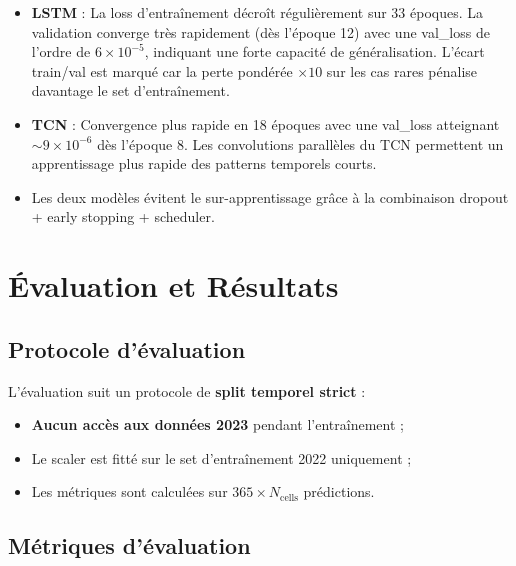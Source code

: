\documentclass[12pt,a4paper]{report}
\begin{document}
\begin{firebox}[title=Observations sur les courbes d'apprentissage]
\begin{itemize}[leftmargin=*,itemsep=3pt]
  \item \textbf{LSTM} : La loss d'entraînement décroît régulièrement sur 33 époques.
    La validation converge très rapidement (dès l'époque 12) avec une val\_loss
    de l'ordre de $6 \times 10^{-5}$, indiquant une forte capacité de généralisation.
    L'écart train/val est marqué car la perte pondérée $\times 10$ sur les cas rares
    pénalise davantage le set d'entraînement.
  \item \textbf{TCN} : Convergence plus rapide en 18 époques avec une val\_loss
    atteignant $\sim 9 \times 10^{-6}$ dès l'époque 8. Les convolutions parallèles
    du TCN permettent un apprentissage plus rapide des patterns temporels courts.
  \item Les deux modèles évitent le sur-apprentissage grâce à la combinaison
    dropout + early stopping + scheduler.
\end{itemize}
\end{firebox}

\clearpage

\chapter{Évaluation et Résultats}
\label{chap:eval}

\section{Protocole d'évaluation}

L'évaluation suit un protocole de \textbf{split temporel strict} :
\begin{itemize}[leftmargin=*]
  \item \textbf{Aucun accès aux données 2023} pendant l'entraînement ;
  \item Le scaler est fitté sur le set d'entraînement 2022 uniquement ;
  \item Les métriques sont calculées sur $365 \times N_\text{cells}$ prédictions.
\end{itemize}

\section{Métriques d'évaluation}
\end{document}
